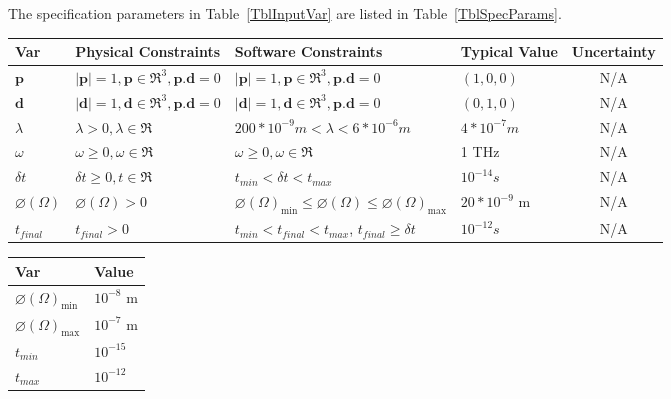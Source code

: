\documentclass[12pt]{article}
\begin{document}
	The specification parameters in Table~\ref{TblInputVar} are listed in
	Table~\ref{TblSpecParams}.
	
	\begin{table}[!h] \caption{Input Variables} \label{TblInputVar} \renewcommand{\arraystretch}{1.2} \noindent \begin{longtable*}{l l l l c} \toprule \textbf{Var} & \textbf{Physical Constraints} & \textbf{Software Constraints} & \textbf{Typical Value} & Uncertainty\\ \midrule 
			$\textbf{p}$ & $|\textbf{p}|=1,  \textbf{p} \in \Re^{3} , \textbf{p}.\textbf{d}=0$ & $|\textbf{p}|=1, \textbf{p} \in \Re^{3}, \textbf{p}.\textbf{d}=0$ & $(1,0,0)$ & N/A \\
			$\textbf{d}$ & $|\textbf{d}|=1,  \textbf{d} \in \Re^{3}, \textbf{p}.\textbf{d}=0$ & $|\textbf{d}|=1, \textbf{d} \in \Re^{3}, \textbf{p}.\textbf{d}=0$ & $(0,1,0)$& N/A\\
			$\lambda$ & $\lambda>0,  \lambda \in \Re$ & $200*10^{-9} m <\lambda<6*10^{-6} m$ & $4 * 10^{-7} m$& N/A\\	 
			$\omega$ & $\omega \geqslant 0, \omega \in \Re$ & $\omega \geqslant 0, \omega \in \Re$ & 1 THz & N/A\\ 
			$\delta t$ & $\delta t \geqslant 0, t \in \Re$ &  $t_{min} < \delta t < t_{max}$ & $10^{-14} s$ & N/A\\
			$\varnothing(\Omega)$ & $\varnothing(\Omega) > 0$ & $\varnothing(\Omega)_{\text{min}} \leq \varnothing(\Omega) \leq \varnothing(\Omega)_{\text{max}}$ & $20*10^{-9}$ \si[per-mode=symbol] {\metre} & N/A \\ 
			$t_{final}$ & $t_{final}>0$ &   $t_{min} < t_{final} < t_{max}$, $t_{final} \geqslant \delta t$ & $10^{-12} s$ & N/A\\
			 \bottomrule \end{longtable*} \end{table}

\begin{table}[!h] \caption{Specification Parameter Values} \label{TblSpecParams} \renewcommand{\arraystretch}{1.2} \noindent \begin{longtable*}{l l} \toprule \textbf{Var} & \textbf{Value} \\ \midrule $\varnothing(\Omega)_{\text{min}}$ & $10^{-8}$ \si{\metre}\\ $\varnothing(\Omega)_{\text{max}}$ & $10^{-7}$ \si{\metre}\\ $t_{min}$ & $10^{-15}$\\ $t_{max}$ & $10^{-12}$\\
		
		
		\bottomrule \end{longtable*} \end{table}
\end{document}
